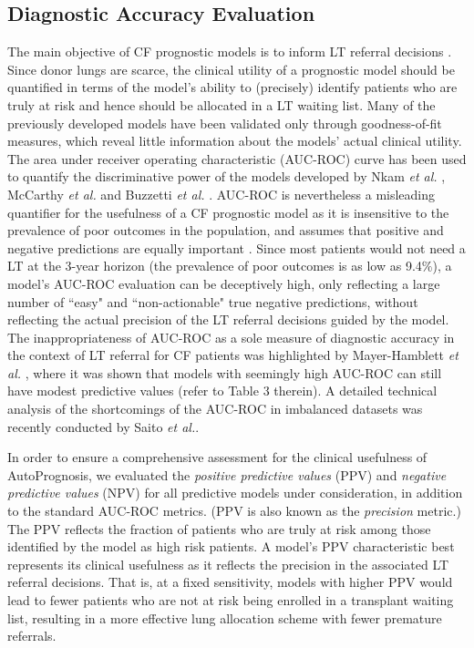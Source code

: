 \documentclass [PhD] {uclathes}
\begin{document}
\subsection{Diagnostic Accuracy Evaluation} 

The main objective of CF prognostic models is to inform LT referral decisions \cite{mayer2002developing,flume1998cystic,braun2015impact,hirche2014practical}. Since donor lungs are scarce\cite{flume1998cystic,liou2005use,liou2001survival}, the clinical utility of a prognostic model should be quantified in terms of the model's ability to (precisely) identify patients who are truly at risk and hence should be allocated in a LT waiting list. Many of the previously developed models have been validated only through goodness-of-fit measures\cite{hayllar1997prognostic,aaron2015statistical}, which reveal little information about the models' actual clinical utility. The area under receiver operating characteristic (AUC-ROC) curve has been used to quantify the discriminative power of the models developed by Nkam {\it et al.} \cite{nkam20173}, McCarthy {\it et al.} \cite{mccarthy2013cf} and Buzzetti {\it et al.} \cite{buzzetti2012validation}. AUC-ROC is nevertheless a misleading quantifier for the usefulness of a CF prognostic model as it is insensitive to the prevalence of poor outcomes in the population, and assumes that positive and negative predictions are equally important \cite{swets1988measuring}. Since most patients would not need a LT at the 3-year horizon (the prevalence of poor outcomes is as low as 9.4$\%$), a model's AUC-ROC evaluation can be deceptively high, only reflecting a large number of ``easy" and ``non-actionable" true negative predictions, without reflecting the actual precision of the LT referral decisions guided by the model. The inappropriateness of AUC-ROC as a sole measure of diagnostic accuracy in the context of LT referral for CF patients was highlighted by Mayer-Hamblett {\it et al.} \cite{mayer2002developing}, where it was shown that models with seemingly high AUC-ROC can still have modest predictive values (refer to Table 3 therein). A detailed technical analysis of the shortcomings of the AUC-ROC in imbalanced datasets was recently conducted by Saito {\it et al.}\cite{saito2015precision}. 

In order to ensure a comprehensive assessment for the clinical usefulness of AutoPrognosis, we evaluated the {\it positive predictive values} (PPV) and {\it negative predictive values} (NPV) for all predictive models under consideration, in addition to the standard AUC-ROC metrics. (PPV is also known as the {\it precision} metric.) The PPV reflects the fraction of patients who are truly at risk among those identified by the model as high risk patients. A model's PPV characteristic best represents its clinical usefulness as it reflects the precision in the associated LT referral decisions\cite{mayer2002developing}. That is, at a fixed sensitivity, models with higher PPV would lead to fewer patients who are not at risk being enrolled in a transplant waiting list, resulting in a more effective lung allocation scheme with fewer premature referrals. 
\end{document}
